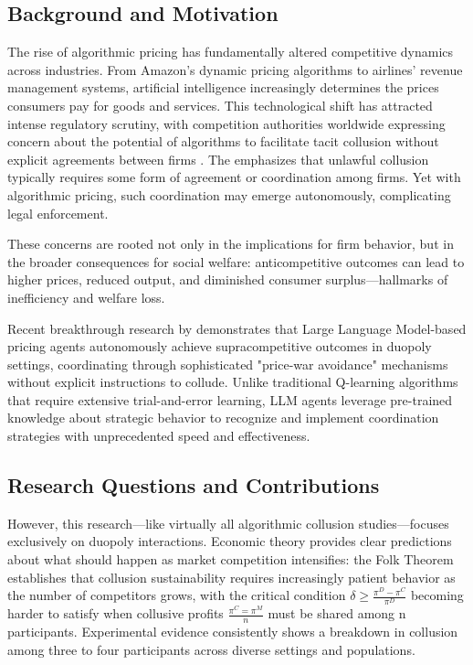 \subsection{Background and Motivation}
The rise of algorithmic pricing has fundamentally altered competitive dynamics across industries. From Amazon's dynamic pricing algorithms to airlines' revenue management systems, artificial intelligence increasingly determines the prices consumers pay for goods and services. This technological shift has attracted intense regulatory scrutiny, with competition authorities worldwide expressing concern about the potential of algorithms to facilitate tacit collusion without explicit agreements between firms \parencite{oecd_algorithmic_2023, harrington_developing_2018}. The \textcite{us_department_of_justice_price_2021} emphasizes that unlawful collusion typically requires some form of agreement or coordination among firms. Yet with algorithmic pricing, such coordination may emerge autonomously, complicating legal enforcement.

These concerns are rooted not only in the implications for firm behavior, but in the broader consequences for social welfare: anticompetitive outcomes can lead to higher prices, reduced output, and diminished consumer surplus—hallmarks of inefficiency and welfare loss.

Recent breakthrough research by \textcite{fish_algorithmic_2025} demonstrates that Large Language Model-based pricing agents autonomously achieve supracompetitive outcomes in duopoly settings, coordinating through sophisticated "price-war avoidance" mechanisms without explicit instructions to collude. Unlike traditional Q-learning algorithms that require extensive trial-and-error learning, LLM agents leverage pre-trained knowledge about strategic behavior to recognize and implement coordination strategies with unprecedented speed and effectiveness.


\subsection{Research Questions and Contributions}
However, this research—like virtually all algorithmic collusion studies—focuses exclusively on duopoly interactions. Economic theory provides clear predictions about what should happen as market competition intensifies: the Folk Theorem establishes that collusion sustainability requires increasingly patient behavior as the number of competitors grows, with the critical condition $\delta \geq \frac{\pi^D - \pi^C}{\pi^D}$ becoming harder to satisfy when collusive profits $\frac{\pi^C = \pi^M}{n}$ must be shared among n participants. Experimental evidence consistently shows a breakdown in collusion among three to four participants across diverse settings and populations.


